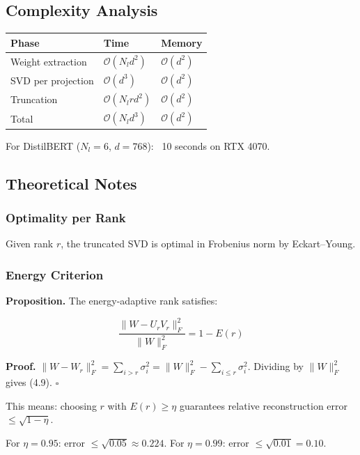 \subsection{Complexity Analysis}

\begin{table}[H]
\centering
\small
\begin{tabular}{lll}
\toprule
\textbf{Phase} & \textbf{Time} & \textbf{Memory} \\
\midrule
Weight extraction & $\mathcal{O}(N_l d^2)$ & $\mathcal{O}(d^2)$ \\
SVD per projection & $\mathcal{O}(d^3)$ & $\mathcal{O}(d^2)$ \\
Truncation & $\mathcal{O}(N_l r d^2)$ & $\mathcal{O}(d^2)$ \\
Total & $\mathcal{O}(N_l d^3)$ & $\mathcal{O}(d^2)$ \\
\bottomrule
\end{tabular}
\end{table}

For DistilBERT ($N_l = 6$, $d = 768$): ~10 seconds on RTX 4070.

\subsection{Theoretical Notes}

\subsubsection{Optimality per Rank}

Given rank $r$, the truncated SVD is optimal in Frobenius norm by Eckart--Young.

\subsubsection{Energy Criterion}

\textbf{Proposition.} The energy-adaptive rank satisfies:

\[
\frac{\|W - U_r V_r\|_F^2}{\|W\|_F^2} = 1 - E(r)
\tag{4.9}
\]

\textbf{Proof.} $\|W - W_r\|_F^2 = \sum_{i > r} \sigma_i^2 = \|W\|_F^2 - \sum_{i \leq r} \sigma_i^2$. 
Dividing by $\|W\|_F^2$ gives (4.9). $\square$

This means: choosing $r$ with $E(r) \geq \eta$ guarantees relative 
reconstruction error $\leq \sqrt{1 - \eta}$.

For $\eta = 0.95$: error $\leq \sqrt{0.05} \approx 0.224$.
For $\eta = 0.99$: error $\leq \sqrt{0.01} = 0.10$.

